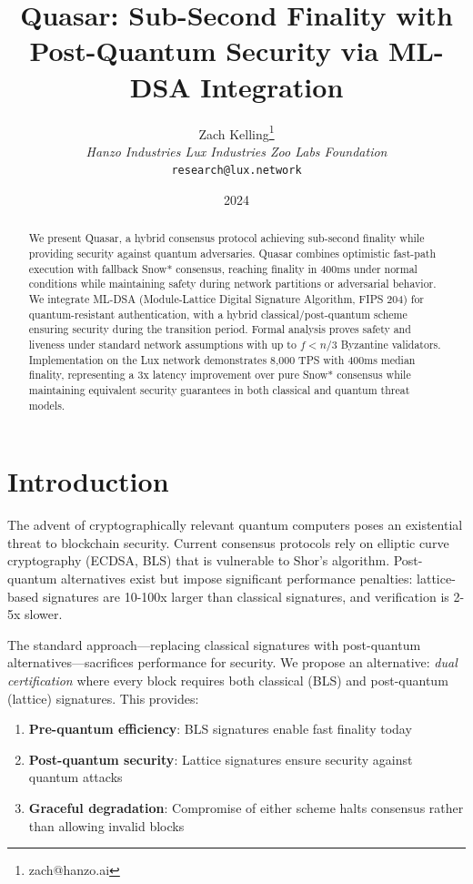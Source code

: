 \documentclass[11pt,a4paper]{article}
\title{Quasar: Sub-Second Finality with Post-Quantum Security via ML-DSA Integration}
\author{Zach Kelling\thanks{zach@hanzo.ai} \\ \textit{Hanzo Industries \quad Lux Industries \quad Zoo Labs Foundation} \\ \texttt{research@lux.network}}
\date{2024}
\begin{document}
\maketitle

\begin{abstract}
We present Quasar, a hybrid consensus protocol achieving sub-second finality while providing security against quantum adversaries. Quasar combines optimistic fast-path execution with fallback Snow* consensus, reaching finality in 400ms under normal conditions while maintaining safety during network partitions or adversarial behavior. We integrate ML-DSA (Module-Lattice Digital Signature Algorithm, FIPS 204) for quantum-resistant authentication, with a hybrid classical/post-quantum scheme ensuring security during the transition period. Formal analysis proves safety and liveness under standard network assumptions with up to $f < n/3$ Byzantine validators. Implementation on the Lux network demonstrates 8,000 TPS with 400ms median finality, representing a 3x latency improvement over pure Snow* consensus while maintaining equivalent security guarantees in both classical and quantum threat models.
\end{abstract}

\section{Introduction}

The advent of cryptographically relevant quantum computers poses an existential threat to blockchain security. Current consensus protocols rely on elliptic curve cryptography (ECDSA, BLS) that is vulnerable to Shor's algorithm. Post-quantum alternatives exist but impose significant performance penalties: lattice-based signatures are 10-100x larger than classical signatures, and verification is 2-5x slower.

The standard approach---replacing classical signatures with post-quantum alternatives---sacrifices performance for security. We propose an alternative: \emph{dual certification} where every block requires both classical (BLS) and post-quantum (lattice) signatures. This provides:

\begin{enumerate}
    \item \textbf{Pre-quantum efficiency}: BLS signatures enable fast finality today
    \item \textbf{Post-quantum security}: Lattice signatures ensure security against quantum attacks
    \item \textbf{Graceful degradation}: Compromise of either scheme halts consensus rather than allowing invalid blocks
\end{enumerate}
\end{document}
